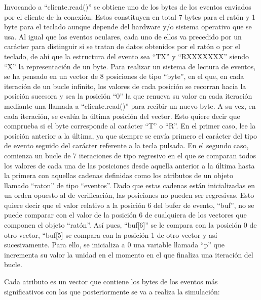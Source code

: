 Invocando a ``cliente.read()'' se obtiene uno de los bytes de los eventos enviados por el cliente de la conexión. Estos constituyen en total 7 bytes para el ratón y 1 byte para el teclado aunque depende del hardware y/o sistema operativo que se usa. Al igual que los eventos oculares, cada uno de ellos va precedido por un carácter para distinguir si se tratan de datos obtenidos por el ratón o por el teclado, de ahí que la estructura del evento sea ``TX'' y ``RXXXXXXX'' siendo ``X'' la representación de un byte. Para realizar un sistema de lectura de eventos, se ha pensado en un vector de 8 posiciones de tipo ``byte'', en el que, en cada iteración de un bucle infinito, los valores de cada posición se recorran hacia la posición sucesora y sea la posición ``0'' la que renueva su valor en cada iteración mediante una llamada a ``cliente.read()'' para recibir un nuevo byte. A su vez, en cada iteración, se evalúa la última posición del vector. Esto quiere decir que comprueba si el byte corresponde al carácter ``T'' o ``R''. En el primer caso, lee la posición anterior a la última, ya que siempre se envía primero el carácter del tipo de evento seguido del carácter referente a la tecla pulsada. En el segundo caso, comienza un bucle de 7 iteraciones de tipo regresivo en el que se comparan todos los valores de cada una de las posiciones desde aquella anterior a la última hasta la primera con aquellas cadenas definidas como los atributos de un objeto llamado ``raton'' de tipo ``eventos''. Dado que estas cadenas están inicializadas en un orden opuesto al de verificación, las posiciones no pueden ser regresivas. Esto quiere decir que el valor relativo a la posición 6 del bufer de evento, ``buf'', no se puede comparar con el valor de la posición 6 de cualquiera de los vectores que componen el objeto ``ratón''. Así pues, ``buf[6]'' se le compara con la posición 0 de otro vector, ``buf[5] se compara con la posición 1 de otro vector y así sucesivamente. Para ello, se inicializa a 0 una variable llamada ``p'' que incrementa su valor la unidad en el momento en el que finaliza una iteración del bucle.

Cada atributo es un vector que contiene los bytes de los eventos más significativos con los que posteriormente se va a realiza la simulación:

